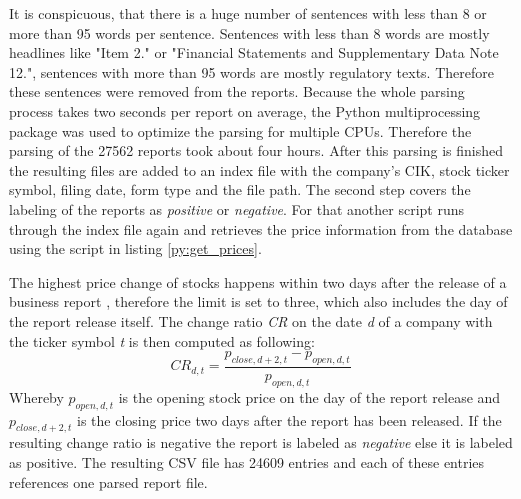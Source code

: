 It is conspicuous, that there is a huge number of sentences with less than 8 or more than 95 words per sentence.
Sentences with less than 8 words are mostly headlines like "Item 2." or "Financial Statements and Supplementary Data Note 12.", sentences with more than 95 words are mostly regulatory texts.
Therefore these sentences were removed from the reports.
Because the whole parsing process takes two seconds per report on average, the Python multiprocessing package was used to optimize the parsing for multiple \acs{CPU}s.
Therefore the parsing of the 27562 reports took about four hours.
After this parsing is finished the resulting files are added to an index file with the company's \ac{CIK}, stock ticker symbol, filing date, form type and the file path.
The second step covers the labeling of the reports as \textit{positive} or \textit{negative}.
For that another script runs through the index file again and retrieves the price information from the database using the script in listing \ref{py:get_prices}.

The highest price change of stocks happens within two days after the release of a business report \cite{Feldman2010}, therefore the limit is set to three, which also includes the day of the report release itself.
The change ratio \textit{CR} on the date \textit{d} of a company with the ticker symbol \textit{t} is then computed as following:
\begin{equation}
    CR_{d,t} = \frac{p_{close, d + 2, t} - p_{open, d, t}}{p_{open, d, t}}
\end{equation}
Whereby $p_{open, d, t}$ is the opening stock price on the day of the report release and $p_{close, d + 2, t}$ is the closing price two days after the report has been released.
If the resulting change ratio is negative the report is labeled as \textit{negative} else it is labeled as positive.
The resulting \ac{CSV} file has 24609 entries and each of these entries references one parsed report file.

